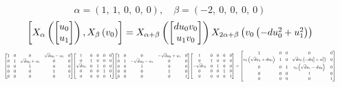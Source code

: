 \documentclass[11pt]{article}
\theoremstyle{definition}
\begin{document}
\[
\alpha = \left( 1, \  1, \  0, \  0, \  0\right), \quad \beta = \left( -2, \  0, \  0, \  0, \  0\right)
\]
\[
\scaletoalign{\textwidth}{\left[ X_{\alpha}\left(\left[\begin{matrix}u_{0}\\u_{1}\end{matrix}\right]\right), X_{\beta}\left(v_{0}\right) \right] = X_{\alpha + \beta}\left(\left[\begin{matrix}d u_{0} v_{0}\\u_{1} v_{0}\end{matrix}\right]\right) X_{2\alpha + \beta}\left(v_{0} \left(- d u_{0}^{2} + u_{1}^{2}\right)\right)}
\]
\[
\scaletoalign{\textwidth}{{\left[\begin{matrix}1 & 0 & 0 & \sqrt{d} u_{0} - u_{1} & 0\\0 & 1 & \sqrt{d} u_{0} + u_{1} & 0 & 0\\0 & 0 & 1 & 0 & 0\\0 & 0 & 0 & 1 & 0\\0 & 0 & 0 & 0 & 1\end{matrix}\right]} {\left[\begin{matrix}1 & 0 & 0 & 0 & 0\\0 & 1 & 0 & 0 & 0\\\sqrt{d} v_{0} & 0 & 1 & 0 & 0\\0 & 0 & 0 & 1 & 0\\0 & 0 & 0 & 0 & 1\end{matrix}\right]} {\left[\begin{matrix}1 & 0 & 0 & - \sqrt{d} u_{0} + u_{1} & 0\\0 & 1 & - \sqrt{d} u_{0} - u_{1} & 0 & 0\\0 & 0 & 1 & 0 & 0\\0 & 0 & 0 & 1 & 0\\0 & 0 & 0 & 0 & 1\end{matrix}\right]} {\left[\begin{matrix}1 & 0 & 0 & 0 & 0\\0 & 1 & 0 & 0 & 0\\- \sqrt{d} v_{0} & 0 & 1 & 0 & 0\\0 & 0 & 0 & 1 & 0\\0 & 0 & 0 & 0 & 1\end{matrix}\right]} = {\left[\begin{matrix}1 & 0 & 0 & 0 & 0\\v_{0} \left(\sqrt{d} u_{1} + d u_{0}\right) & 1 & 0 & \sqrt{d} v_{0} \left(- d u_{0}^{2} + u_{1}^{2}\right) & 0\\0 & 0 & 1 & v_{0} \left(\sqrt{d} u_{1} - d u_{0}\right) & 0\\0 & 0 & 0 & 1 & 0\\0 & 0 & 0 & 0 & 1\end{matrix}\right]}}
\]
\end{document}
